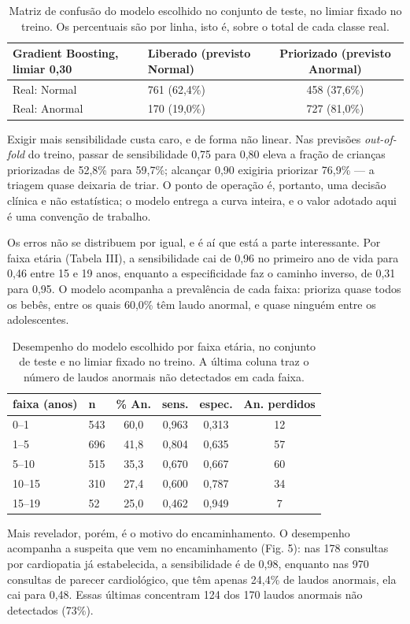 \documentclass[conference]{IEEEtran}
\begin{document}
\begin{table}[!t]
\caption{Matriz de confusão do modelo escolhido no conjunto de teste, no limiar fixado no treino. Os percentuais são por linha, isto é, sobre o total de cada classe real.}
\label{tab:matriz_confusao}
\centering
\small
\begin{tabular}{llc}
\toprule
Gradient Boosting, limiar 0,30 & Liberado (previsto Normal) & Priorizado (previsto Anormal) \\
\midrule
Real: Normal & 761 (62,4\%) & 458 (37,6\%) \\
Real: Anormal & 170 (19,0\%) & 727 (81,0\%) \\
\bottomrule
\end{tabular}
\end{table}
Exigir mais sensibilidade custa caro, e de forma não linear. Nas previsões \textit{out-of-fold} do treino, passar de sensibilidade 0,75 para 0,80 eleva a fração de crianças priorizadas de 52,8\% para 59,7\%; alcançar 0,90 exigiria priorizar 76,9\% --- a triagem quase deixaria de triar. O ponto de operação é, portanto, uma decisão clínica e não estatística; o modelo entrega a curva inteira, e o valor adotado aqui é uma convenção de trabalho.

Os erros não se distribuem por igual, e é aí que está a parte interessante. Por faixa etária (Tabela III), a sensibilidade cai de 0,96 no primeiro ano de vida para 0,46 entre 15 e 19 anos, enquanto a especificidade faz o caminho inverso, de 0,31 para 0,95. O modelo acompanha a prevalência de cada faixa: prioriza quase todos os bebês, entre os quais 60,0\% têm laudo anormal, e quase ninguém entre os adolescentes.

\begin{table}[!t]
\caption{Desempenho do modelo escolhido por faixa etária, no conjunto de teste e no limiar fixado no treino. A última coluna traz o número de laudos anormais não detectados em cada faixa.}
\label{tab:erros_por_faixa}
\centering
\small
\begin{tabular}{llcccc}
\toprule
faixa (anos) & n & \% An. & sens. & espec. & An. perdidos \\
\midrule
0--1 & 543 & 60,0 & 0,963 & 0,313 & 12 \\
1--5 & 696 & 41,8 & 0,804 & 0,635 & 57 \\
5--10 & 515 & 35,3 & 0,670 & 0,667 & 60 \\
10--15 & 310 & 27,4 & 0,600 & 0,787 & 34 \\
15--19 & 52 & 25,0 & 0,462 & 0,949 & 7 \\
\bottomrule
\end{tabular}
\end{table}
Mais revelador, porém, é o motivo do encaminhamento. O desempenho acompanha a suspeita que vem no encaminhamento (Fig. 5): nas 178 consultas por cardiopatia já estabelecida, a sensibilidade é de 0,98, enquanto nas 970 consultas de parecer cardiológico, que têm apenas 24,4\% de laudos anormais, ela cai para 0,48. Essas últimas concentram 124 dos 170 laudos anormais não detectados (73\%).
\end{document}
